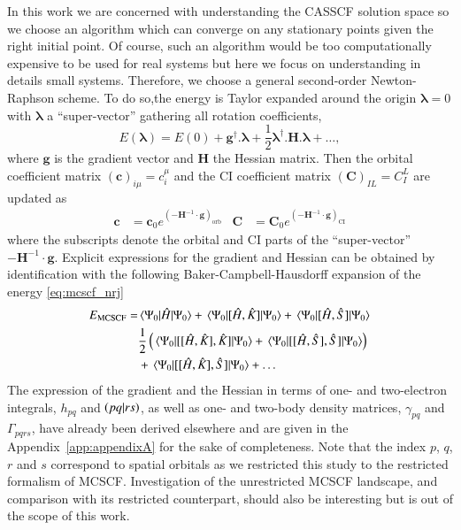 \documentclass[aip,jcp,reprint,noshowkeys,superscriptaddress]{revtex4-1}
\begin{document}
In this work we are concerned with understanding the CASSCF solution space so we choose an algorithm which can converge on any stationary points given the right initial point.
Of course, such an algorithm would be too computationally expensive to be used for real systems but here we focus on understanding in details small systems.
Therefore, we choose a general second-order Newton-Raphson scheme. \cite{Olsen_1983}
To do so,the energy is Taylor expanded around the origin $\bm{\lambda}=0$ with $\bm{\lambda}$ a ``super-vector'' gathering all rotation coefficients,
\begin{equation}
  \label{eq:mcscf_nrj_taylor}
  E(\bm{\lambda}) = E(0) + \bm{g}^\dagger.\bm{\lambda} + \frac{1}{2} \bm{\lambda}^\dagger.\boldsymbol{H}.\bm{\lambda} + \dots,
\end{equation}
where $\bm{g}$ is the gradient vector and $\bm{H}$ the Hessian matrix.
Then the orbital coefficient matrix $(\bm{c})_{i \mu} = c_i^\mu$ and the CI coefficient matrix $(\bm{C})_{IL} = C_I^L$ are updated as
\begin{align}
  \bm{c} &= \bm{c}_0 e^{(-\bm{H}^{-1}\cdot \bm{g})_{\text{orb}}} & \bm{C} &= \bm{C}_0 e^{(-\bm{H}^{-1}\cdot \bm{g})_{\text{CI}}}
\end{align}
where the subscripts denote the orbital and CI parts of the ``super-vector'' $-\bm{H}^{-1}\cdot \bm{g}$.
Explicit expressions for the gradient and Hessian can be obtained by identification with the following Baker-Campbell-Hausdorff expansion of the energy \eqref{eq:mcscf_nrj}
\begin{equation}
  \label{eq:mcscf_nrj_bch}
  \begin{split}
    E_{\text{MCSCF}} = &\mel{\Psi_0}{\Hat{H}}{\Psi_0} + \mel{\Psi_0}{[\Hat{H},\Hat{K}]}{\Psi_0} + \mel{\Psi_0}{[\Hat{H},\Hat{S}]}{\Psi_0}  \\
    &\frac{1}{2} \left(\mel{\Psi_0}{[[\Hat{H},\Hat{K}],\Hat{K}]}{\Psi_0}+ \mel{\Psi_0}{[[\Hat{H},\Hat{S}],\Hat{S}]}{\Psi_0}\right) \\
    &+ \mel{\Psi_0}{[[\Hat{H},\Hat{K}],\Hat{S}]}{\Psi_0} + \dots
  \end{split}
\end{equation}
The expression of the gradient and the Hessian in terms of one- and two-electron integrals, $h_{pq}$ and  $\ceri{pq}{rs}$, as well as one- and two-body density matrices, $\gamma_{pq}$ and $\Gamma_{pqrs}$, have already been derived elsewhere \cite{Olsen_1983} and are given in the Appendix~\ref{app:appendixA} for the sake of completeness.
Note that the index $p$, $q$, $r$ and $s$ correspond to spatial orbitals as we restricted this study to the restricted formalism of MCSCF.
Investigation of the unrestricted MCSCF landscape, and comparison with its restricted counterpart, should also be interesting but is out of the scope of this work.
\end{document}
